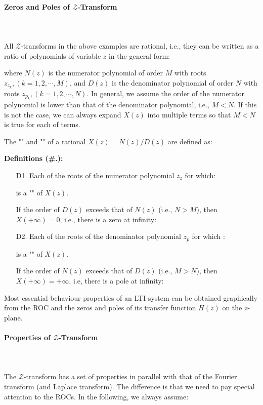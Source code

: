 	\pagebreak
	\paragraph{Zeros and Poles of $\mathcal{Z}$-Transform}\mbox{}\\\\
	All $\mathcal{Z}$-transforms in the above examples are rational, i.e., they can be written as a ratio of polynomials of variable $z$ in the general form:
	
	where $N(z)$ is the numerator polynomial of order $M$ with roots $z_{z_k}, (k=1,2, \cdots, M)$, and $D(z)$ is the denominator polynomial of order $N$ with roots $z_{p_k}, (k=1,2, \cdots, N)$. In general, we assume the order of the numerator polynomial is lower than that of the denominator polynomial, i.e.,  $M < N$. If this is not the case, we can always expand $X(z)$ into multiple terms so that $M<N$ is true for each of terms.
	
	The "" and "" of a rational $X(z)=N(z)/D(z)$ are defined as:
	
	\textbf{Definitions (\#\thesection.\mydef):} 
	\begin{enumerate}
		\item[D1.] Each of the roots of the numerator polynomial $z_z$ for which:
		
		is a "" of $X(z)$.
	
	  	If the order of $D(z)$ exceeds that of $N(z)$ (i.e., $N>M$), then $X({+\infty})=0$, i.e., there is a zero at infinity:
	  	
	
		\item[D2.] Each of the roots of the denominator polynomial $z_p$ for which :
		
		is a "" of $X(z)$.
	
		If the order of $N(z)$ exceeds that of $D(z)$ (i.e., $M>N$), then $X({+\infty})={+\infty}$, i.e, there is a pole at infinity: 
	  
	\end{enumerate}
	Most essential behaviour properties of an LTI system can be obtained graphically from the ROC and the zeros and poles of its transfer function $H(z)$ on the $z$-plane.
	
	\paragraph{Properties of $\mathcal{Z}$-Transform}\mbox{}\\\\
	The $\mathcal{Z}$-transform has a set of properties in parallel with that of the Fourier transform (and Laplace transform). The difference is that we need to pay special attention to the ROCs. In the following, we always assume:
	
